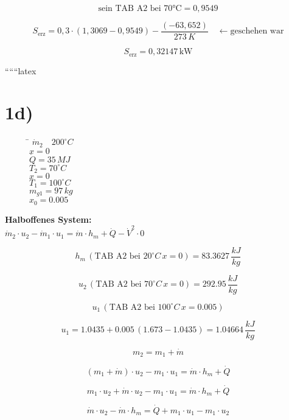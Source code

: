 \[
\text{sein TAB A2 bei 70°C} = 0{,}9549
\]

\[
S_{\text{erz}} = 0{,}3 \cdot (1{,}3069 - 0{,}9549) - \frac{(-63{,}652)}{273 \, K} \quad \leftarrow \text{geschehen war}
\]

\[
S_{\text{erz}} = 0{,}32147 \, \text{kW}
\]

``````latex


\section*{1d)}

\begin{figure}[h!]
\centering
\begin{minipage}{0.4\textwidth}
\centering
\begin{tabbing}
\hspace{2cm} \= \kill
\(\dot{m}_2 \quad 200^\circ C\) \\
\(x = 0\) \\
\(\dot{Q} = 35 \, MJ\) \\
\(T_2 = 70^\circ C\) \\
\(x = 0\) \\
\(T_1 = 100^\circ C\) \\
\(m_{g1} = 97 \, kg\) \\
\(x_0 = 0.005\)
\end{tabbing}
\end{minipage}
\end{figure}

\textbf{Halboffenes System:} \\
\(\dot{m}_2 \cdot u_2 - \dot{m}_1 \cdot u_1 = \dot{m} \cdot h_m + \dot{Q} - \dot{V}^2 \cdot 0\)

\[
h_m \, (\text{TAB A2 bei } 20^\circ C \, x = 0) = 83.3627 \, \frac{kJ}{kg}
\]

\[
u_2 \, (\text{TAB A2 bei } 70^\circ C \, x = 0) = 292.95 \, \frac{kJ}{kg}
\]

\[
u_1 \, (\text{TAB A2 bei } 100^\circ C \, x = 0.005)
\]

\[
u_1 = 1.0435 + 0.005 \, (1.673 - 1.0435) = 1.04664 \, \frac{kJ}{kg}
\]

\[
m_2 = m_1 + \dot{m}
\]

\[
(m_1 + \dot{m}) \cdot u_2 - m_1 \cdot u_1 = \dot{m} \cdot h_m + \dot{Q}
\]

\[
m_1 \cdot u_2 + \dot{m} \cdot u_2 - m_1 \cdot u_1 = \dot{m} \cdot h_m + \dot{Q}
\]

\[
\dot{m} \cdot u_2 - \dot{m} \cdot h_m = \dot{Q} + m_1 \cdot u_1 - m_1 \cdot u_2
\]

